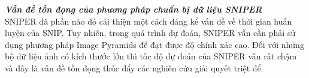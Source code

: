 {    \noindent
    \textbf{\textit{Vấn đề tồn đọng của phương pháp chuẩn bị dữ liệu SNIPER }} \\
    SNIPER  đã phần nào đó cải thiện một cách đáng kể vấn đề về thời gian huấn luyện của SNIP.
    Tuy nhiên, trong quá trình dự đoán, SNIPER  vẫn cần phải sử dụng phương pháp Image Pyramids để đạt được độ chính xác cao.
    Đối với những bộ dữ liệu ảnh có kích thước lớn thì tốc độ dự đoán của SNIPER  vẫn rất chậm và đây là vấn đề tồn đọng thúc đẩy các nghiên cứu giải quyết triệt để.
}
